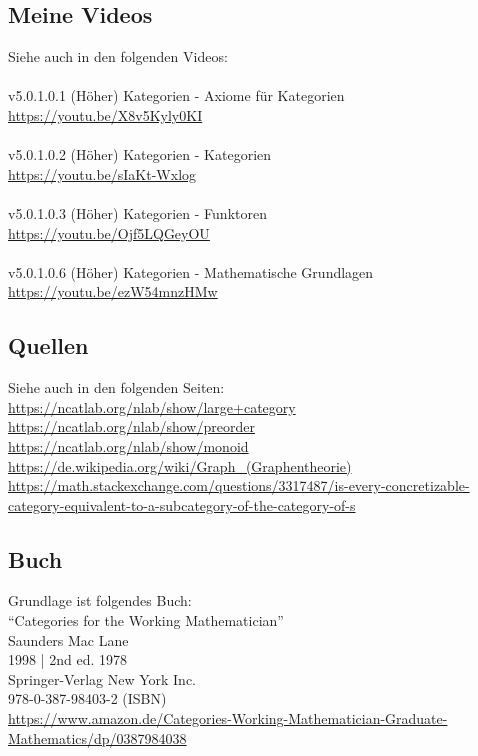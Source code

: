 \documentclass[a4paper]{amsart}
\theoremstyle{definition}
\begin{document}
\subsection*{Meine Videos}
Siehe auch in den folgenden Videos:\\
\\
v5.0.1.0.1 (Höher) Kategorien - Axiome für Kategorien\\
\url{https://youtu.be/X8v5Kyly0KI}\\
\\
v5.0.1.0.2 (Höher) Kategorien - Kategorien\\
\url{https://youtu.be/sIaKt-Wxlog}\\
\\
v5.0.1.0.3 (Höher) Kategorien - Funktoren\\
\url{https://youtu.be/Ojf5LQGeyOU}\\
\\
v5.0.1.0.6 (Höher) Kategorien - Mathematische Grundlagen\\
\url{https://youtu.be/ezW54mnzHMw}

\subsection*{Quellen}
Siehe auch in den folgenden Seiten:\\
\url{https://ncatlab.org/nlab/show/large+category}\\
\url{https://ncatlab.org/nlab/show/preorder}\\
\url{https://ncatlab.org/nlab/show/monoid}\\
\url{https://de.wikipedia.org/wiki/Graph_(Graphentheorie)}\\
{\tiny\url{https://math.stackexchange.com/questions/3317487/is-every-concretizable-category-equivalent-to-a-subcategory-of-the-category-of-s}}

\subsection*{Buch}
Grundlage ist folgendes Buch:\\
"`Categories for the Working Mathematician"'\\
Saunders Mac Lane\\
1998 | 2nd ed. 1978\\
Springer-Verlag New York Inc.\\
978-0-387-98403-2 (ISBN)\\
{\tiny
   \url{https://www.amazon.de/Categories-Working-Mathematician-Graduate-Mathematics/dp/0387984038}}\\
\end{document}
